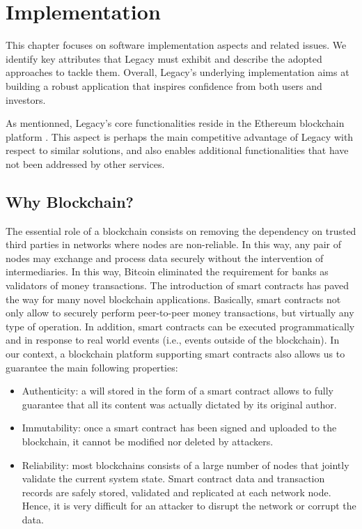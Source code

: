 \chapter{Implementation} %
\label{cha:implementation}

This chapter focuses on software implementation aspects and related issues. We identify key attributes that Legacy must exhibit and describe the adopted approaches to tackle them. Overall, Legacy’s underlying implementation aims at building a robust application that inspires confidence from both users and investors.

As mentionned, Legacy’s core functionalities reside in the Ethereum blockchain platform \cite{Ethereum}. This aspect is perhaps the main competitive advantage of Legacy with respect to similar solutions, and also enables additional functionalities that have not been addressed by other services. 

\section{Why Blockchain?} %
\label{sec:why_blockchain_}

The essential role of a blockchain consists on removing the dependency on trusted third parties in networks where nodes are non-reliable. In this way, any pair of nodes may exchange and process data securely without the intervention of intermediaries. In this way, Bitcoin eliminated the requirement for banks as validators of money transactions. The introduction of smart contracts has paved the way for many novel blockchain applications. Basically, smart contracts not only allow to securely perform peer-to-peer money transactions, but virtually any type of operation. In addition, smart contracts can be executed programmatically and in response to real world events (i.e., events outside of the blockchain). In our context, a blockchain platform supporting smart contracts also allows us to guarantee the main following properties: 

\begin{itemize}
	\item Authenticity: a will stored in the form of a smart contract allows to fully guarantee that all its content was actually dictated by its original author.
	\item Immutability: once a smart contract has been signed and uploaded to the blockchain, it cannot be modified nor deleted by attackers.
	\item Reliability: most blockchains consists of a large number of nodes that jointly validate the current system state. Smart contract data and transaction records are safely stored, validated and replicated at each network node. Hence, it is very difficult for an attacker to disrupt the network or corrupt the data.
\end{itemize}

